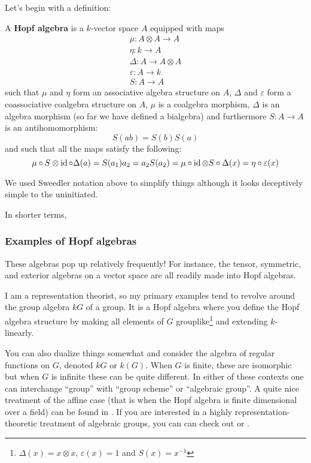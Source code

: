 \documentclass[12pt]{article}
\begin{document}
Let's begin with a definition:
\begin{defn}
	A \textbf{Hopf algebra} is a $k$-vector space $A$ equipped with maps 
	\begin{gather*}
		\mu:A\otimes A\to A\\
		\eta:k\to A\\
		\Delta:A\to A\otimes A\\
		\varepsilon:A\to k\\
		S:A\to A
	\end{gather*}
	such that $\mu$ and $\eta$ form an associative algebra structure on $A$, $\Delta$ and $\varepsilon$ form a coassociative coalgebra structure on $A$,
	$\mu$ is a coalgebra morphism, $\Delta$ is an algebra morphism (so far we have defined a bialgebra) and furthermore $S:A\to A$ is an antihomomorphism:
	\[S(ab)=S(b)S(a)\]
	and such that all the maps satisfy the following:
	\[\mu\circ S\otimes\operatorname{id}\circ \Delta(a)=S(a_1)a_2=a_2S(a_2)=\mu\circ \operatorname{id}\otimes S\circ\Delta(x)=\eta\circ\varepsilon(x)\]
\end{defn}
\begin{rmk}
	We used Sweedler notation above to simplify things although it looks deceptively simple to the uninitiated.
\end{rmk}
\begin{rmk}
	In shorter terms, 
\end{rmk}

\subsubsection{Examples of Hopf algebras}
These algebras pop up relatively frequently! For instance, the tensor, symmetric, and exterior algebras on a vector space are all 
readily made into Hopf algebras.

I am a representation theorist, so my primary examples tend to revolve around 
the group algebra $kG$ of a group. It is a Hopf algebra where you define the Hopf algebra structure by making all 
elements of $G$ grouplike\footnote{$\Delta(x)=x\otimes x$, $\varepsilon(x)=1$ and $S(x)=x^{-1}$} and extending $k$-linearly.

You can also dualize things somewhat and consider the algebra of regular functions on $G$, denoted $kG$ or $k(G)$. When $G$ is finite,
these are isomorphic but when $G$ is infinite these can be quite different. In either of these contexts one can interchange ``group''
with ``group scheme'' or ``algebraic group''. A quite nice treatment of the affine case (that is when the Hopf algebra is finite dimensional over a field)
can be found in \cite{waterhouse}. If you are interested in a highly representation-theoretic treatment of algebraic groups, you can can check out \cite{jantzen-algebraic}
or \cite{Milne}.
\end{document}
